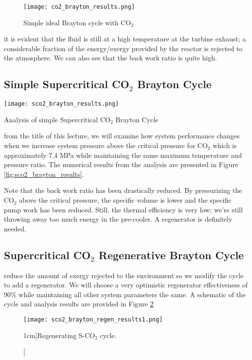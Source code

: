 \begin{figure}
\texttt{[image: co2\_brayton\_results.png]}
\caption{Simple ideal Brayton cycle with CO$_{2}$}
\label{fig:co2_brayton_results}
\end{figure}

 it is evident that the fluid is still at a high temperature at the turbine exhaust; a considerable fraction of the energy/exergy provided by the reactor is rejected to the atmosphere. We can also see that the back work ratio is quite high. 

\subsection{Simple Supercritical CO$_{2}$ Brayton Cycle}

\begin{marginfigure}
\texttt{[image: sco2\_brayton\_results.png]}
\caption{Analysis of simple Supercritical CO$_2$ Brayton Cycle}
\label{fig:sco2_brayton_results}
\end{marginfigure}

 from the title of this lecture, we will examine how system performance changes when we increase system pressure above the critical pressure for CO$_{2}$ which is approximately 7.4 MPa while maintaining the same maximum temperature and pressure ratio.  The numerical results from the analysis are presented in Figure \ref{fig:sco2_brayton_results}. 

Note that the back work ratio has been drastically reduced. By pressurizing the CO$_2$ above the critical pressure, the specific volume is lower and the specific pump work has been reduced.  Still, the thermal efficiency is very low; we're still throwing away too much energy in the pre-cooler. A regenerator is definitely needed.

\subsection{Supercritical CO$_2$ Regenerative Brayton Cycle}
 reduce the amount of exergy rejected to the environment so we modify the cycle to add a regenerator.  We will choose a very optimistic regenerator effectiveness of 90\% while maintaining all other system parameters the same.  A schematic of the cycle and analysis results are provided in Figure \ref{fig:sco2_brayton_regen_results1}
\begin{figure}
\texttt{[image: sco2\_brayton\_regen\_results1.png]}
\caption[][1cm]{Regenerating S-CO$_{2}$ cycle.}
\label{fig:sco2_brayton_regen_results1}
\end{figure}

